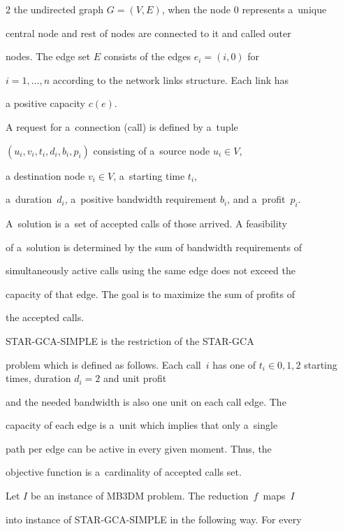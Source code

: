 \begin{multicols}{2}
the undirected graph $G=(V,E)$, when the node $0$ represents a~unique


central node and rest of nodes are connected to it and called outer


nodes. The edge set $E$ consists of the edges $e_i=(i,0)$ for


$i=1,\ldots,n$ according to the network links structure. Each link has


a positive capacity $c(e)$.





A request for a~connection ({call}) is defined by a~tuple


$(u_i,v_i,t_i,d_i,b_i,p_i)$ consisting of a~source node $u_i \in V$,


a destination node $v_i \in V$, a~starting time $t_i$,


a~duration~$d_i$, a~positive bandwidth requirement $b_i$, and a~profit~$p_i$.


A~solution is a~set of accepted calls of those arrived. A feasibility


of a~solution is determined by the sum of bandwidth requirements of


simultaneously active calls using the same edge does not exceed the


capacity of that edge. The goal is to maximize the sum of profits of


the accepted calls.





{STAR-GCA-SIMPLE} is the restriction of the {STAR-GCA}


problem which is defined as follows. Each call~$i$ has one of $t_i


\in {0,1,2}$ starting times, duration $d_i=2$ and unit profit


and the needed bandwidth is also one unit on each call edge. The


capacity of each edge is a~unit which implies that only a~single


path per edge can be active in every given moment. Thus, the


objective function is a~cardinality of accepted calls set.





Let $I$ be an instance of MB3DM problem. The reduction~$f$~maps~$I$


into instance of STAR-GCA-SIMPLE in the following way. For every



\end{multicols}
